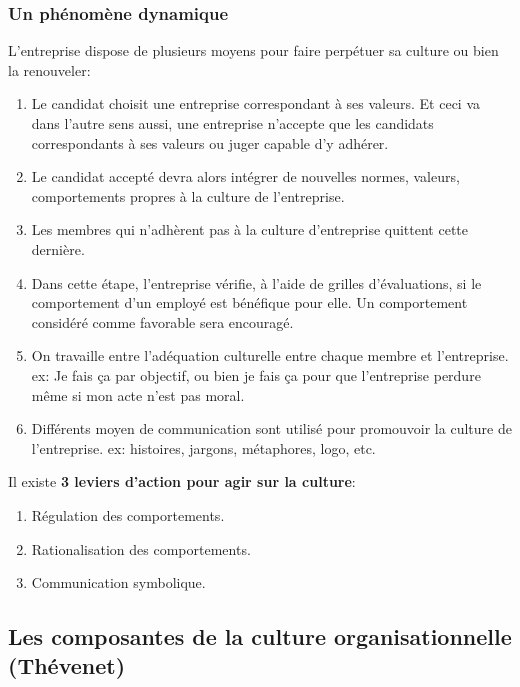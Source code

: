 \documentclass[12pt]{article}
\begin{document}
		\subsubsection{Un phénomène dynamique}
		
		
		L'entreprise dispose de plusieurs moyens pour faire perpétuer sa culture ou bien la renouveler:
		\begin{enumerate}
		\item Le candidat choisit une entreprise correspondant à ses valeurs. Et ceci va dans l'autre sens aussi, une entreprise n'accepte que les candidats correspondants à ses valeurs ou juger capable d'y adhérer.
		\item Le candidat accepté devra alors intégrer de nouvelles normes, valeurs, comportements propres à la culture de l'entreprise.
		\item Les membres qui n'adhèrent pas à la culture d'entreprise quittent cette dernière.
		\item Dans cette étape, l'entreprise vérifie, à l'aide de grilles d'évaluations, si le comportement d'un employé est bénéfique pour elle. Un comportement considéré comme favorable sera encouragé.
		\item On travaille entre l'adéquation culturelle entre chaque membre et l'entreprise. \newline
		ex:  Je fais ça par objectif, ou bien je fais ça pour que l'entreprise perdure même si mon acte n'est pas moral.
		\item Différents moyen de communication sont utilisé pour promouvoir la culture de l'entreprise. \newline
		ex: histoires, jargons, métaphores, logo, etc. \newline
		\end{enumerate}
		
		Il existe \textbf{3 leviers d'action pour agir sur la culture}:
		\begin{enumerate}
		\item Régulation des comportements.
		\item Rationalisation des comportements.
		\item Communication symbolique.
		\end{enumerate}
		
	\subsection{Les composantes de la culture organisationnelle (Thévenet)}
	
\end{document}
